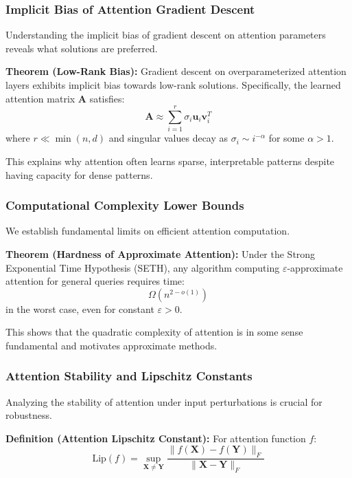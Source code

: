 \subsubsection{Implicit Bias of Attention Gradient Descent}

Understanding the implicit bias of gradient descent on attention parameters reveals what solutions are preferred.

\textbf{Theorem (Low-Rank Bias):} Gradient descent on overparameterized attention layers exhibits implicit bias towards low-rank solutions. Specifically, the learned attention matrix $\mathbf{A}$ satisfies:
\begin{equation}
\mathbf{A} \approx \sum_{i=1}^r \sigma_i \mathbf{u}_i \mathbf{v}_i^T
\end{equation}
where $r \ll \min(n, d)$ and singular values decay as $\sigma_i \sim i^{-\alpha}$ for some $\alpha > 1$.

This explains why attention often learns sparse, interpretable patterns despite having capacity for dense patterns.

\subsubsection{Computational Complexity Lower Bounds}

We establish fundamental limits on efficient attention computation.

\textbf{Theorem (Hardness of Approximate Attention):} Under the Strong Exponential Time Hypothesis (SETH), any algorithm computing $\varepsilon$-approximate attention for general queries requires time:
\begin{equation}
\Omega(n^{2-o(1)})
\end{equation}
in the worst case, even for constant $\varepsilon > 0$.

This shows that the quadratic complexity of attention is in some sense fundamental and motivates approximate methods.

\subsubsection{Attention Stability and Lipschitz Constants}

Analyzing the stability of attention under input perturbations is crucial for robustness.

\textbf{Definition (Attention Lipschitz Constant):} For attention function $f$:
\begin{equation}
\text{Lip}(f) = \sup_{\mathbf{X} \neq \mathbf{Y}} \frac{\|f(\mathbf{X}) - f(\mathbf{Y})\|_F}{\|\mathbf{X} - \mathbf{Y}\|_F}
\end{equation}

